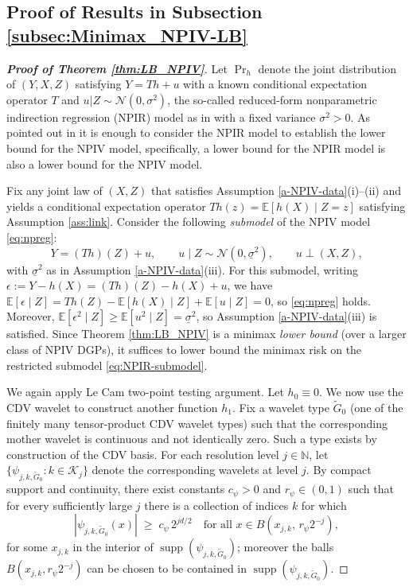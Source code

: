 \documentclass[12pt,american]{article}
\DeclareMathOperator{\supp}{supp}
\theoremstyle{definition}
\theoremstyle{plain}
\theoremstyle{definition}
\theoremstyle{plain}
\theoremstyle{plain}
\theoremstyle{plain}
\theoremstyle{plain}
\theoremstyle{plain}
\newcommand{\E}{\mathbb{E}}
\begin{document}
\subsection{Proof of Results in Subsection \ref{subsec:Minimax_NPIV-LB}}

\begin{proof}[\textbf{Proof of Theorem \ref{thm:LB_NPIV}}]
Let $\Pr_{h}$ denote the joint distribution of $(Y,X,Z)$ satisfying $Y= T h+u$ with a known conditional expectation operator $T$ and  $u|Z\sim \mathcal N(0,\sigma^2)$, the so-called reduced-form nonparametric indirection regression (NPIR) model as in \cite{chen2011rate} with a fixed variance $\sigma^2>0$. As pointed out in \cite{chen2011rate} it is enough to consider the NPIR model to establish the lower bound for the NPIV model, specifically, a lower bound for the NPIR model is also a lower bound for the NPIV model.

Fix any joint law of $(X,Z)$ that satisfies Assumption \ref{a-NPIV-data}(i)--(ii) and yields a conditional
expectation operator $T h(z)=\E[h(X)\mid Z=z]$ satisfying Assumption \ref{ass:link}.
Consider the following \emph{submodel} of the NPIV model \eqref{eq:npreg}:
\begin{equation}\label{eq:NPIR-submodel}
Y = (Th)(Z) + u,\qquad u\mid Z \sim \mathcal N(0,\underline\sigma^2),\qquad u \perp (X,Z),
\end{equation}
with $\underline\sigma^2$ as in Assumption \ref{a-NPIV-data}(iii).  For this submodel, writing
$\epsilon := Y-h(X) = (Th)(Z)-h(X)+u$, we have
$\E[\epsilon\mid Z]=Th(Z)-\E[h(X)\mid Z]+\E[u\mid Z]=0$, so \eqref{eq:npreg} holds.
Moreover, $\E[\epsilon^2\mid Z]\geq \E[u^2\mid Z]=\underline\sigma^2$, so Assumption
\ref{a-NPIV-data}(iii) is satisfied.  Since Theorem \ref{thm:LB_NPIV} is a minimax \emph{lower bound}
(over a larger class of NPIV DGPs), it suffices to lower bound the minimax risk on the restricted
submodel \eqref{eq:NPIR-submodel}.

We again apply Le Cam two-point testing argument.
Let $h_0\equiv 0$. We now use the CDV wavelet to construct another function $h_1$.
Fix a wavelet type $\tilde G_0$ (one of the finitely many tensor-product CDV wavelet types) such that
the corresponding mother wavelet is continuous and not identically zero. Such a type exists by
construction of the CDV basis. For each resolution level $j\in\mathbb N$, let
$\{\psi_{j,k,\tilde G_0}:k\in\mathcal K_j\}$ denote the corresponding wavelets at level $j$.
By compact support and continuity, there exist constants $c_\psi>0$ and $r_\psi\in(0,1)$ such that for
every sufficiently large $j$ there is a collection of indices $k$ for which
\begin{equation}\label{eq:wavelet-lower}
|\psi_{j,k,\tilde G_0}(x)| \;\geq\; c_\psi\,2^{jd/2}
\quad\text{for all }x\in B(x_{j,k},\,r_\psi 2^{-j}),
\end{equation}
for some $x_{j,k}$ in the interior of $\supp(\psi_{j,k,\tilde G_0})$; moreover the balls
$B(x_{j,k},r_\psi 2^{-j})$ can be chosen to be contained in $\supp(\psi_{j,k,\tilde G_0})$.


\end{proof}
\end{document}
